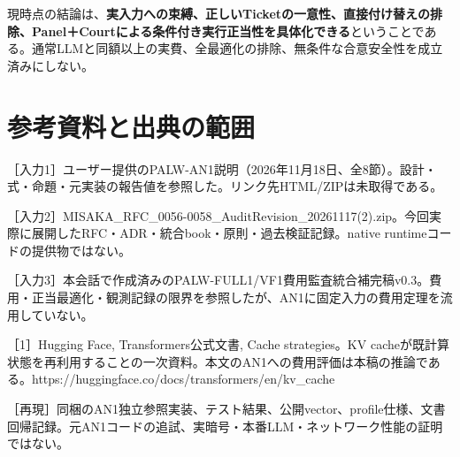 \documentclass[
  10pt,
]{article}
\begin{document}
現時点の結論は、\textbf{実入力への束縛、正しいTicketの一意性、直接付け替えの排除、Panel＋Courtによる条件付き実行正当性を具体化できる}ということである。通常LLMと同額以上の実費、全最適化の排除、無条件な合意安全性を成立済みにしない。

\newpage

\section{参考資料と出典の範囲}\label{ux53c2ux8003ux8cc7ux6599ux3068ux51faux5178ux306eux7bc4ux56f2}

［入力1］ユーザー提供のPALW-AN1説明（2026年11月18日、全8節）。設計・式・命題・元実装の報告値を参照した。リンク先HTML/ZIPは未取得である。

［入力2］MISAKA\_RFC\_0056-0058\_AuditRevision\_20261117(2).zip。今回実際に展開したRFC・ADR・統合book・原則・過去検証記録。native
runtimeコードの提供物ではない。

［入力3］本会話で作成済みのPALW-FULL1/VF1費用監査統合補完稿v0.3。費用・正当最適化・観測記録の限界を参照したが、AN1に固定入力の費用定理を流用していない。

［1］Hugging Face, Transformers公式文書, Cache strategies。KV
cacheが既計算状態を再利用することの一次資料。本文のAN1への費用評価は本稿の推論である。https://huggingface.co/docs/transformers/en/kv\_cache

［再現］同梱のAN1独立参照実装、テスト結果、公開vector、profile仕様、文書回帰記録。元AN1コードの追試、実暗号・本番LLM・ネットワーク性能の証明ではない。
\end{document}
